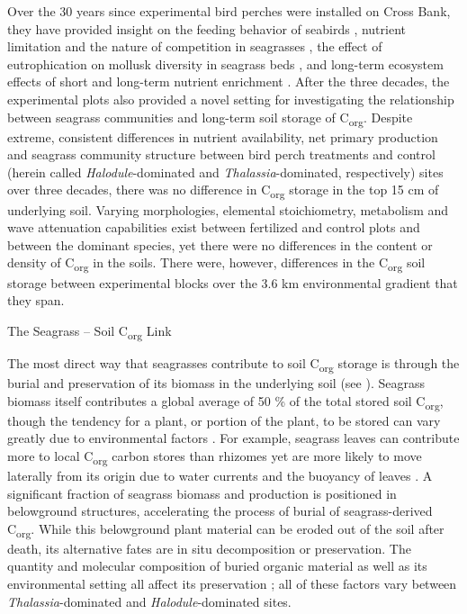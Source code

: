 	Over the 30 years since experimental bird perches were installed on Cross Bank, they have provided insight on the feeding behavior of seabirds \citep{Powell:1985uy}, nutrient limitation and the nature of competition in seagrasses \citep{Powell:1989tt, Powell:1991va, Fourqurean:1995uj}, the effect of eutrophication on mollusk diversity in seagrass beds \citep{Ferguson:2008fd}, and long-term ecosystem effects of short and long-term nutrient enrichment \citep{Herbert:2008di}. After the three decades, the experimental plots also provided a novel setting for investigating the relationship between seagrass communities and long-term soil storage of C\textsubscript{org}. Despite extreme, consistent differences in nutrient availability, net primary production and seagrass community structure between bird perch treatments and control (herein called \textit{Halodule}-dominated and \textit{Thalassia}-dominated, respectively) sites over three decades, there was no difference in C\textsubscript{org} storage in the top 15 cm of underlying soil. Varying morphologies, elemental stoichiometry, metabolism and wave attenuation capabilities exist between fertilized and control plots and between the dominant species, yet there were no differences in the content or density of C\textsubscript{org} in the soils. There were, however, differences in the C\textsubscript{org} soil storage between experimental blocks over the 3.6 km environmental gradient that they span.

\bigskip
\noindent The Seagrass – Soil C\textsubscript{org} Link
\medskip

	The most direct way that seagrasses contribute to soil C\textsubscript{org} storage is through the burial and preservation of its biomass in the underlying soil (see \citealt{Holmer:2009tj}). Seagrass biomass itself contributes a global average of 50 \% of the total stored soil C\textsubscript{org}, though the tendency for a plant, or portion of the plant, to be stored can vary greatly due to environmental factors \citep{Kennedy:2010if}. For example, seagrass leaves can contribute more to local C\textsubscript{org} carbon stores than rhizomes \citep{Kennedy:2010if} yet are more likely to move laterally from its origin due to water currents and the buoyancy of leaves \citep{Zieman:1979ui}. A significant fraction of seagrass biomass and production is positioned in belowground structures, accelerating the process of burial of seagrass-derived C\textsubscript{org}. While this belowground plant material can be eroded out of the soil after death, its alternative fates are in situ decomposition or preservation. The quantity and molecular composition of buried organic material as well as its environmental setting all affect its preservation \citep{Harrison:1989tp, Arndt:2013bc}; all of these factors vary between \textit{Thalassia}-dominated and \textit{Halodule}-dominated sites.

